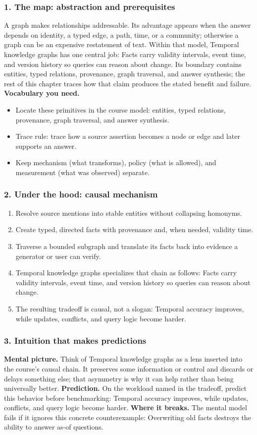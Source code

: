 \subsubsection*{1. The map: abstraction and prerequisites}
A graph makes relationships addressable. Its advantage appears when the answer depends on identity, a typed edge, a path, time, or a community; otherwise a graph can be an expensive restatement of text.
Within that model, Temporal knowledge graphs has one central job: Facts carry validity intervals, event time, and version history so queries can reason about change. Its boundary contains entities, typed relations, provenance, graph traversal, and answer synthesis; the rest of this chapter traces how that claim produces the stated benefit and failure.
\textbf{Vocabulary you need.}\begin{itemize}
\item Locate these primitives in the course model: entities, typed relations, provenance, graph traversal, and answer synthesis.
\item Trace rule: trace how a source assertion becomes a node or edge and later supports an answer.
\item Keep mechanism (what transforms), policy (what is allowed), and measurement (what was observed) separate.
\end{itemize}
\subsubsection*{2. Under the hood: causal mechanism}\begin{enumerate}
\item Resolve source mentions into stable entities without collapsing homonyms.
\item Create typed, directed facts with provenance and, when needed, validity time.
\item Traverse a bounded subgraph and translate its facts back into evidence a generator or user can verify.
\item Temporal knowledge graphs specializes that chain as follows: Facts carry validity intervals, event time, and version history so queries can reason about change.
\item The resulting tradeoff is causal, not a slogan: Temporal accuracy improves, while updates, conflicts, and query logic become harder.
\end{enumerate}
\subsubsection*{3. Intuition that makes predictions}
\textbf{Mental picture.} Think of Temporal knowledge graphs as a lens inserted into the course's causal chain. It preserves some information or control and discards or delays something else; that asymmetry is why it can help rather than being universally better.
\textbf{Prediction.} On the workload named in the tradeoff, predict this behavior before benchmarking: Temporal accuracy improves, while updates, conflicts, and query logic become harder.
\textbf{Where it breaks.} The mental model fails if it ignores this concrete counterexample: Overwriting old facts destroys the ability to answer as-of questions.
